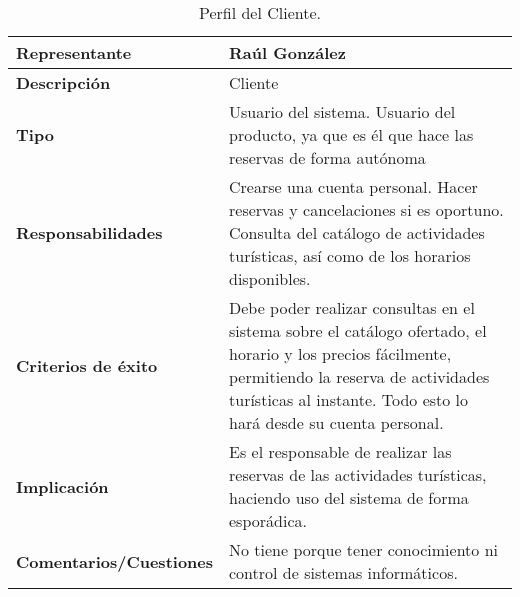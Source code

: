 \begin{table}
    \centering
    \begin{tabular}{|p{5cm}|p{10cm}|}
        \hline
        \cellcolor[HTML]{FFCCC9} \textbf{Representante} & Raúl González \\ \hline
        \cellcolor[HTML]{FFCCC9}\textbf{Descripción} & Cliente \\ \hline
        \cellcolor[HTML]{FFCCC9}\textbf{Tipo} & Usuario del sistema. Usuario del producto, ya que es él que hace las reservas de forma autónoma \\ \hline
        \cellcolor[HTML]{FFCCC9}\textbf{Responsabilidades} & Crearse una cuenta personal. Hacer reservas y cancelaciones si es oportuno. Consulta del catálogo de actividades turísticas, así como de los horarios disponibles.\\ \hline
        \cellcolor[HTML]{FFCCC9}\textbf{Criterios de éxito} & Debe poder realizar consultas en el sistema sobre el catálogo ofertado, el horario y los precios fácilmente, permitiendo la reserva de actividades turísticas al instante. Todo esto lo hará desde su cuenta personal. \\ \hline
        \cellcolor[HTML]{FFCCC9}\textbf{Implicación} & Es el responsable de realizar las reservas de las actividades turísticas, haciendo uso del sistema de forma esporádica. \\ \hline
        \cellcolor[HTML]{FFCCC9}\textbf{Comentarios/Cuestiones} & No tiene porque tener conocimiento ni control de sistemas informáticos. \\ \hline
    \end{tabular}
    \caption{Perfil del Cliente.}
    \label{tab:per-cliente}
\end{table}
